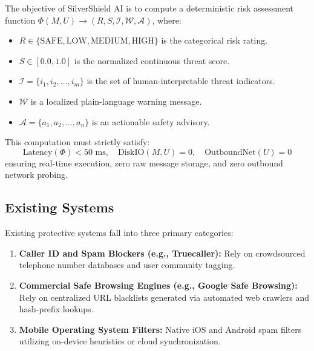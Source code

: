 \documentclass[conference]{IEEEtran}
\begin{document}
The objective of SilverShield AI is to compute a deterministic risk assessment function $\Phi(M, U) \to (R, S, \mathcal{I}, \mathcal{W}, \mathcal{A})$, where:
\begin{itemize}
    \item $R \in \{\text{SAFE}, \text{LOW}, \text{MEDIUM}, \text{HIGH}\}$ is the categorical risk rating.
    \item $S \in [0.0, 1.0]$ is the normalized continuous threat score.
    \item $\mathcal{I} = \{i_1, i_2, \dots, i_m\}$ is the set of human-interpretable threat indicators.
    \item $\mathcal{W}$ is a localized plain-language warning message.
    \item $\mathcal{A} = \{a_1, a_2, \dots, a_n\}$ is an actionable safety advisory.
\end{itemize}
This computation must strictly satisfy:
\begin{equation}
    \text{Latency}(\Phi) < 50\text{ ms}, \quad \text{DiskIO}(M, U) = 0, \quad \text{OutboundNet}(U) = 0
\end{equation}
ensuring real-time execution, zero raw message storage, and zero outbound network probing.

\subsection{Existing Systems}
Existing protective systems fall into three primary categories:
\begin{enumerate}
    \item \textbf{Caller ID and Spam Blockers (e.g., Truecaller):} Rely on crowdsourced telephone number databases and user community tagging.
    \item \textbf{Commercial Safe Browsing Engines (e.g., Google Safe Browsing):} Rely on centralized URL blacklists generated via automated web crawlers and hash-prefix lookups.
    \item \textbf{Mobile Operating System Filters:} Native iOS and Android spam filters utilizing on-device heuristics or cloud synchronization.
\end{enumerate}
\end{document}
